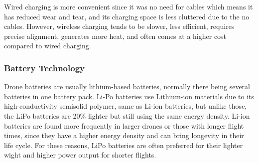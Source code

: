 \documentclass{article}
\begin{document}
Wired charging is more convenient since it was no need for cables which means it has reduced wear and tear, and its charging space is less cluttered due to the no cables. However, wireless charging tends to be slower, less efficient, requires precise alignment, generates more heat, and often comes at a higher cost compared to wired charging.
\cite{wirelessLu}

\subsubsection{Battery Technology}
Drone batteries are usually lithium-based batteries, normally there being several batteries in one battery pack. Li-Po batteries use Lithium-ion materials due to its high-conductivity semisolid polymer, same as Li-ion batteries, but unlike those, the LiPo batteries are 20\% lighter but still using the same energy density. Li-ion batteries are found more frequently in larger drones or those with longer flight times, since they have a higher energy density and can bring longevity in their life cycle. For these reasons, LiPo batteries are often preferred for their lighter wight and higher power output for shorter flights. 
\cite{dronebatteriesKim}

\end{document}

